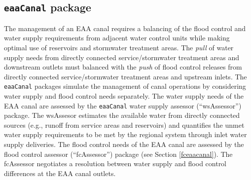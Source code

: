 \subsection{{\tt eaaCanal} package}\label{wseaacanal}

The management of an EAA canal requires a balancing of the flood
control and water supply requirements from adjacent water control
units while making optimal use of reservoirs and stormwater treatment
areas.  The \emph{pull} of water supply needs from directly connected
service/stormwater treatment areas and downstream outlets must
balanced with the \emph{push} of flood control releases from directly
connected service/stormwater treatment areas and upstream inlets.  The
{\tt eaaCanal} packages simulate the management of canal operations by
considering water supply and flood control needs separately.  The
water supply needs of the EAA canal are assessed by the {\tt eaaCanal}
water supply assessor (``wsAssessor'') package.  The wsAssesor
estimates the available water from directly connected sources (e.g.,
runoff from service areas and reservoirs) and quantifies the unmet
water supply requirements to be met by the regional system through
inlet water supply deliveries.  The flood control needs of the EAA
canal are assessed by the flood control assessor (``fcAssessor'')
package (see Section \ref{fceaacanal}).  The fcAssessor negotiates a
resolution between water supply and flood control differences at the
EAA canal outlets.

